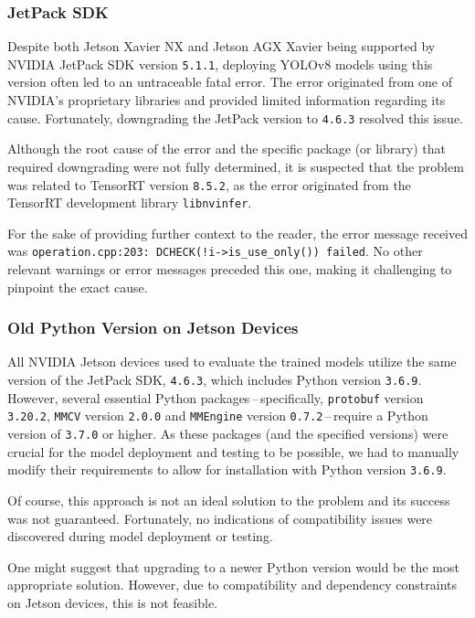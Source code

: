 \subsubsection*{JetPack SDK}

Despite both Jetson Xavier NX and Jetson AGX Xavier being supported by NVIDIA
JetPack SDK version \texttt{5.1.1}, deploying YOLOv8 models using this version
often led to an untraceable fatal error. The error originated from one of
NVIDIA's proprietary libraries and provided limited information regarding its
cause. Fortunately, downgrading the JetPack version to \texttt{4.6.3} resolved
this issue.

Although the root cause of the error and the specific package (or library) that
required downgrading were not fully determined, it is suspected that the problem
was related to TensorRT version \texttt{8.5.2}, as the error originated from the
TensorRT development library \texttt{libnvinfer}.

For the sake of providing further context to the reader, the error message
received was \verb|operation.cpp:203: DCHECK(!i->is_use_only()) failed|. No
other relevant warnings or error messages preceded this one, making it
challenging to pinpoint the exact cause.


\subsubsection*{Old Python Version on Jetson Devices}

All NVIDIA Jetson devices used to evaluate the trained models utilize the same
version of the JetPack SDK, \texttt{4.6.3}, which includes Python version
\texttt{3.6.9}. However, several essential Python packages\,--\,specifically,
\texttt{protobuf} version \texttt{3.20.2}, \texttt{MMCV} version \texttt{2.0.0}
and \texttt{MMEngine} version \texttt{0.7.2}\,--\,require a Python version of
\texttt{3.7.0} or higher. As these packages (and the specified versions) were
crucial for the model deployment and testing to be possible, we had to manually
modify their requirements to allow for installation with Python version
\texttt{3.6.9}.

Of course, this approach is not an ideal solution to the problem and its success
was not guaranteed.  Fortunately, no indications of compatibility issues were
discovered during model deployment or testing.

One might suggest that upgrading to a newer Python version would be the most
appropriate solution. However, due to compatibility and dependency constraints
on Jetson devices, this is not feasible.


